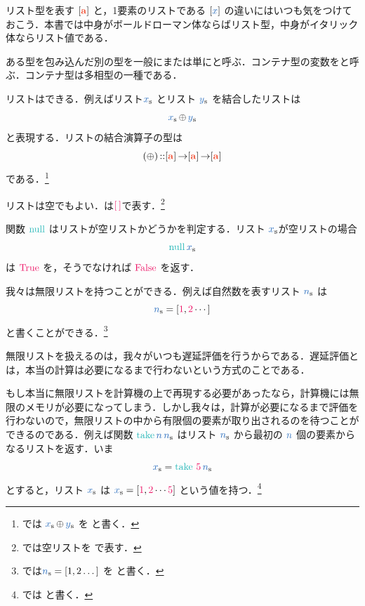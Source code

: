 \documentclass[a5paper,twoside,fleqn,draft]{jsbook}
\begin{document}
リスト型を表す $[\mA]$ と，1要素のリストである $[\hVar{x}]$ の違いにはいつも気をつけておこう．本書では中身がボールドローマン体ならばリスト型，中身がイタリック体ならリスト値である．

ある型を包み込んだ別の型を一般にまたは単にと呼ぶ．コンテナ型の変数をと呼ぶ．コンテナ型は多相型の一種である．


\separator

リストはできる．例えばリスト$\mList{x}$ とリスト
$\mList{y}$ を結合したリストは
\begin{equation}
  \mList{x}\mAppend\mList{y}
\end{equation}
と表現する．リストの結合演算子の型は
\begin{equation}
  (\mAppend)
  \mIn[\mA]\mFuncArrow[\mA]\mFuncArrow[\mA]
\end{equation}
である．\footnote{\haskell では $\mList{x}\mAppend\mList{y}$ を  と書く．}

\separator

リストは空でもよい．は$\mEmptyList$で表す．\footnote{\haskell では空リストを \code{[]} で表す．}

関数 $\mNull$ はリストが空リストかどうかを判定する．リスト $\mList{x}$が空リストの場合
\begin{equation}
  \mNull\mList{x}
\end{equation}
は $\hTrue$ を，そうでなければ $\hFalse$ を返す．

\separator

我々は無限リストを持つことができる．例えば自然数を表すリスト
$\mList{n}$ は
\begin{equation*}
  \mList{n}
  =[\hConstant{1},\mTwoNumber\dotsb]
\end{equation*}
と書くことができる．\footnote{\haskell では$\mList{n}=[1,2\dots]$ を  と書く．}

無限リストを扱えるのは，我々がいつも遅延評価を行うからである．遅延評価とは，本当の計算は必要になるまで行わないという方式のことである．

もし本当に無限リストを計算機の上で再現する必要があったなら，計算機には無限のメモリが必要になってしまう．しかし我々は，計算が必要になるまで評価を行わないので，無限リストの中から有限個の要素が取り出されるのを待つことができるのである．例えば関数 $\mTake\hVar{n}\,\mList{n}$ はリスト $\mList{n}$ から最初の $\hVar{n}$ 個の要素からなるリストを返す．いま
\begin{equation*}
  \mList{x}
  =\mTake\,\mFiveNumber\,\mList{n}
\end{equation*}
とすると，リスト $\mList{x}$ は $\mList{x}=[\hConstant{1},\mTwoNumber\dotsb\mFiveNumber]$ という値を持つ．\footnote{\haskell では  と書く．}
\end{document}
